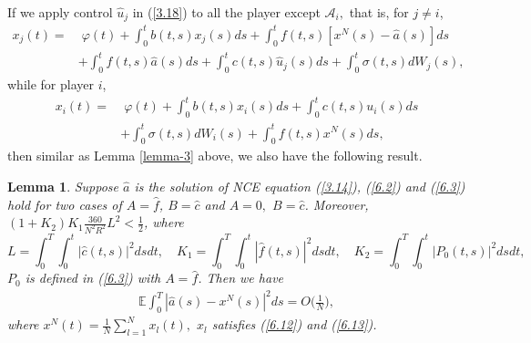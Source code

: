 \documentclass[11pt]{article}
\newtheorem{lemma}{Lemma}[section]
\def\dbE{\mathbb{E}}
\begin{document}
If we apply control $\widehat{u}_j$ in (\ref{3.18}) to all the player except $\mathcal{A}_i,$ that is, for $j\neq i$,
%
\begin{align}
x_{j}(t) = & \; \varphi(t)+\int_{0}^{t}b(t,s)x_{j}(s)ds+\int_{0}^{t}f(t,s)[x^{N}(s)-\widehat{a}(s)]ds \nonumber \\
& +\int_{0}^{t}f(t,s)\widehat{a}(s)ds+\int_{0}^{t}c(t,s)\widehat{u}_{j}(s)ds+\int_{0}^{t}\sigma (t,s)dW_{j}(s), \label{6.12}
\end{align}
%
while for player $i$,
%
\begin{align}
x_{i}(t) = & \; \varphi(t)+\int_{0}^{t}b(t,s)x_{i}(s)ds+\int_{0}^{t}c(t,s)u_{i}(s)ds \nonumber \\
&+\int_{0}^{t}\sigma (t,s)dW_{i}(s)+\int_{0}^{t}f(t,s)x^{N}(s)ds, \label{6.13}
\end{align}
%
then similar as Lemma \ref{lemma-3} above, we also have the
following result.
%
\begin{lemma}\label{lemma6.4}
Suppose $\widehat{a}$ is the solution of NCE equation (\ref{3.14}),
(\ref{6.2}) and (\ref{6.3}) hold for two cases of $A=\widehat{f}$,
$B=\widehat{c}$ and $A=0,$ $B=\widehat{c}$. Moreover,
$(1+K_2)K_1\frac{360}{N^{2}R^2}L^2<\frac 1 2$, where
%
\[
L=\int_0^T\int_0^t|\widehat{c}(t,s)|^2dsdt, \quad
K_1=\int_0^T\int_0^t|\widehat{f}(t,s)|^2dsdt,\quad
K_2=\int_0^T\int_0^t|P_0(t,s)|^2dsdt,
\]
$P_0$ is defined in (\ref{6.3}) with $A=\widehat{f}$. Then we have
%
\begin{eqnarray*}
\dbE\int_0^T|\widehat{a}(s)-x^{N}(s)|^2ds=O\Big(\frac{1}{N}\Big),
\end{eqnarray*}
%
where $x^{N}(t)=\frac{1}{N}\sum_{l=1}^{N}x_{l}(t),$ $x_l$
satisfies (\ref{6.12}) and (\ref{6.13}).
\end{lemma}
\end{document}
